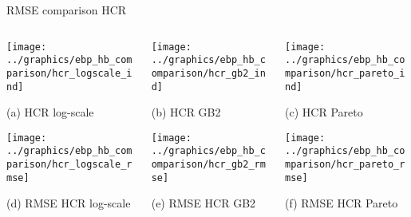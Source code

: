 \begin{frame}{RMSE comparison HCR}
    \begin{columns}
        \begin{column}{0.32\textwidth}
            \centering

            \texttt{[image: ../graphics/ebp\_hb\_comparison/hcr\_logscale\_ind]}

            \scriptsize{(a) HCR log-scale}

            \texttt{[image: ../graphics/ebp\_hb\_comparison/hcr\_logscale\_rmse]}

            \scriptsize{(d) RMSE HCR log-scale}

        \end{column}



        \begin{column}{0.32\textwidth}
            \texttt{[image: ../graphics/ebp\_hb\_comparison/hcr\_gb2\_ind]}

            \scriptsize{(b) HCR GB2}

            \texttt{[image: ../graphics/ebp\_hb\_comparison/hcr\_gb2\_rmse]}

            \scriptsize{(e) RMSE HCR GB2}
        \end{column}

        \begin{column}{0.32\textwidth}
            \texttt{[image: ../graphics/ebp\_hb\_comparison/hcr\_pareto\_ind]}

            \scriptsize{(c) HCR Pareto}

            \texttt{[image: ../graphics/ebp\_hb\_comparison/hcr\_pareto\_rmse]}

            \scriptsize{(f) RMSE HCR Pareto}
        \end{column}
    \end{columns}
\end{frame}

